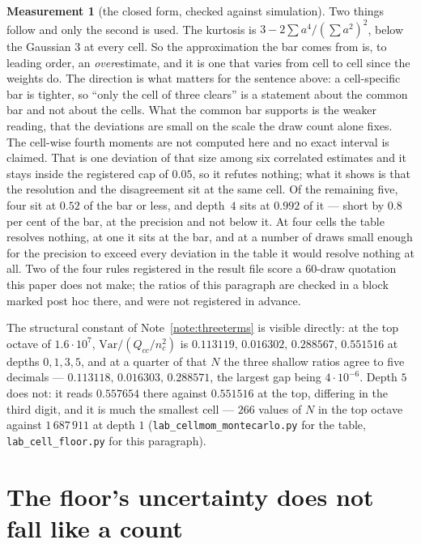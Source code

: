 \documentclass[11pt,a4paper]{article}
\theoremstyle{plain}
\theoremstyle{definition}
\newtheorem{measurement}[theorem]{Measurement}
\theoremstyle{remark}
\begin{document}
\begin{measurement}[the closed form, checked against simulation]
Two things follow and only the second is used. The kurtosis is
$3-2\sum a^4/(\sum a^2)^2$, below the Gaussian $3$ at every cell.
So the approximation the bar comes from is, to leading order, an
\emph{over}estimate, and it is one that varies from cell to cell since
the weights do. The direction is what matters for the sentence above:
a cell-specific bar is tighter, so ``only the cell of three clears''
is a statement about the common bar and not about the cells. What the
common bar supports is the weaker reading, that the deviations are
small on the scale the draw count alone fixes. The cell-wise fourth
moments are not computed here and no exact interval is claimed. That is one deviation
of that size among six correlated estimates and it stays inside the
registered cap of $0.05$, so it refutes nothing; what it shows is that
the resolution and the disagreement sit at the same cell. Of the
remaining five, four sit at $0.52$ of the bar or less, and depth~$4$
sits at $0.992$ of it --- short by $0.8$ per cent of the bar, at the
precision and not below it. At four cells the table resolves nothing,
at one it sits at the bar, and at a number of draws small enough for
the precision to exceed every deviation in the table it would resolve
nothing at all. Two of the four rules
registered in the result file score a $60$-draw quotation this
paper does not make; the ratios of this paragraph are checked in a
block marked post hoc there, and were not registered in advance.

The structural constant of Note~\ref{note:threeterms} is visible
directly: at the top octave of $1.6\cdot10^7$,
$\mathrm{Var}/(Q_{cc}/n_c^2)$ is
$0.113119,\,0.016302,\,0.288567,\,0.551516$ at depths $0,1,3,5$, and
at a quarter of that $N$ the three shallow ratios agree to five
decimals --- $0.113118,\,0.016303,\,0.288571$, the largest gap being
$4\cdot10^{-6}$. Depth $5$ does not: it reads
$0.557654$ there against $0.551516$ at the top, differing in the third
digit, and it is much the smallest cell --- $266$ values of $N$ in the
top octave against $1\,687\,911$ at depth $1$
(\texttt{lab\_cellmom\_montecarlo.py} for the table,
\texttt{lab\_cell\_floor.py} for this paragraph).
\end{measurement}

\section{The floor's uncertainty does not fall like a count}%
\label{sec:coh}
\end{document}
